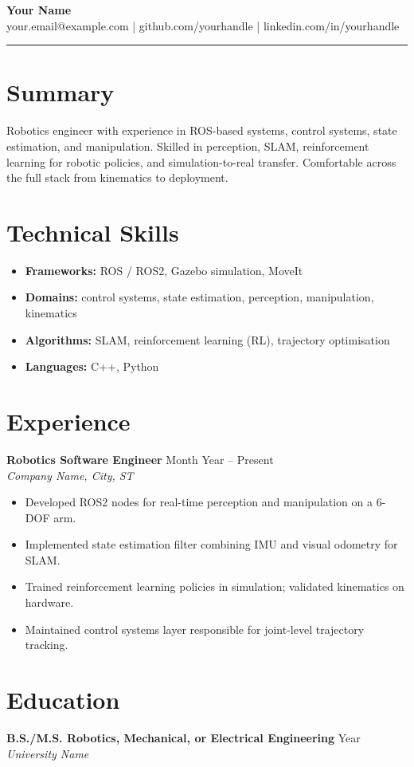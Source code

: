 \documentclass[11pt,letterpaper]{article}
\begin{document}
{\Large \textbf{Your Name}} \\
your.email@example.com \quad | \quad github.com/yourhandle \quad | \quad linkedin.com/in/yourhandle

\bigskip
\hrule
\bigskip

\section*{Summary}
Robotics engineer with experience in ROS-based systems, control systems, state estimation,
and manipulation. Skilled in perception, SLAM, reinforcement learning for robotic policies,
and simulation-to-real transfer. Comfortable across the full stack from kinematics to deployment.

\section*{Technical Skills}
\begin{itemize}[leftmargin=*]
  \item \textbf{Frameworks:} ROS / ROS2, Gazebo simulation, MoveIt
  \item \textbf{Domains:} control systems, state estimation, perception, manipulation, kinematics
  \item \textbf{Algorithms:} SLAM, reinforcement learning (RL), trajectory optimisation
  \item \textbf{Languages:} C++, Python
\end{itemize}

\section*{Experience}

\textbf{Robotics Software Engineer} \hfill Month Year -- Present \\
\textit{Company Name, City, ST}
\begin{itemize}[leftmargin=*]
  \item Developed ROS2 nodes for real-time perception and manipulation on a 6-DOF arm.
  \item Implemented state estimation filter combining IMU and visual odometry for SLAM.
  \item Trained reinforcement learning policies in simulation; validated kinematics on hardware.
  \item Maintained control systems layer responsible for joint-level trajectory tracking.
\end{itemize}

\section*{Education}
\textbf{B.S./M.S. Robotics, Mechanical, or Electrical Engineering} \hfill Year \\
\textit{University Name}
\end{document}

